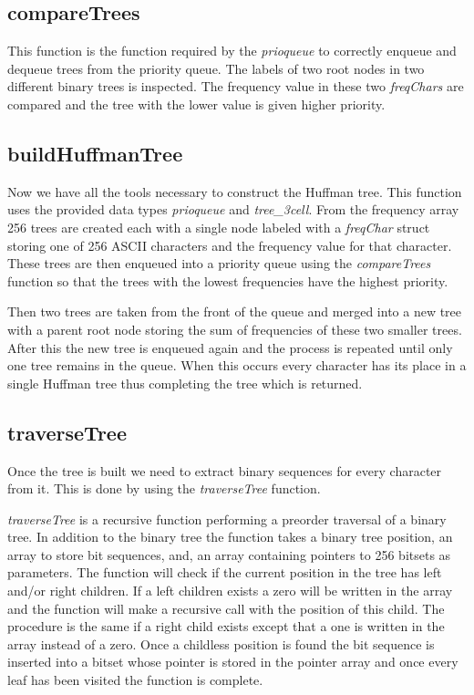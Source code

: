 \documentclass[a4paper,11pt,twoside]{article}
\begin{document}
\subsection{compareTrees}
This function is the function required by the \emph{prioqueue} to correctly enqueue and dequeue trees from the priority queue.
The labels of two root nodes in two different binary trees is inspected. The frequency value in these two \emph{freqChars} are compared and the tree with the lower value is given higher priority.

\subsection{buildHuffmanTree}
Now we have all the tools necessary to construct the Huffman tree. This function uses the provided data types \emph{prioqueue} and \emph{tree\_3cell}. From the frequency array 256 trees are created 
each with a single node labeled with a \emph{freqChar} struct storing one of 256 ASCII characters and the frequency value for that character. These trees are then enqueued into a priority queue using the \emph{compareTrees} function so that the trees with the lowest frequencies have the highest priority. 

Then two trees are taken from the front of the queue and merged into a new tree with a parent root node storing the sum of frequencies of these two smaller trees. After this the new tree is enqueued again and the process is repeated until only one tree remains in the queue. When this occurs every character has its place in a single Huffman tree thus completing the tree which is returned.

\subsection{traverseTree}
Once the tree is built we need to extract binary sequences for every character from it. This is done by using the \emph{traverseTree} function. 

\emph{traverseTree} is a recursive function performing a preorder traversal of a binary tree. In addition to the binary tree the function takes a binary tree position, an array to store bit sequences, and, an array containing pointers to 256 bitsets as parameters. The function will check if the current position in the tree has left and/or right children. If a left children exists a zero will be written in the array and the function will make a recursive call with the position of this child. The procedure is the same if a right child exists except that a one is written in the array instead of a zero. Once a childless position is found the bit sequence is inserted into a bitset whose pointer is stored in the pointer array and once every leaf has been visited the function is complete.
\end{document}
